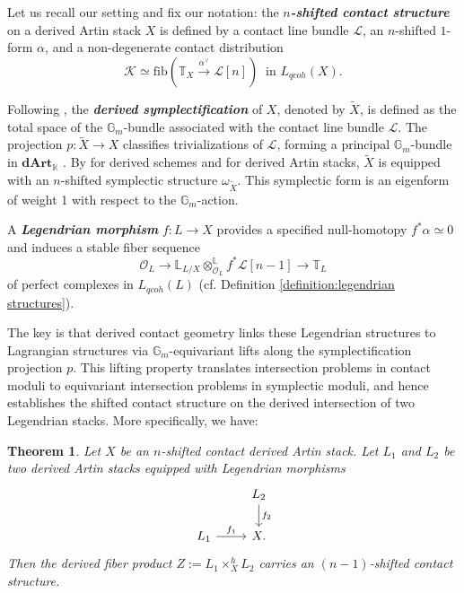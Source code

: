\documentclass[reqno]{amsart}
\newtheorem{theorem}{Theorem}[section]
\theoremstyle{definition}
\theoremstyle{remark}
\newcommand{\LL}{\mathbb{L}}
\newcommand{\TT}{\mathbb{T}}
\newcommand{\Gm}{\mathbb{G}_m}
\newcommand{\cO}{\mathcal{O}}
\newcommand{\cL}{\mathcal{L}}
\newcommand{\cK}{\mathcal{K}}
\newcommand{\K}{\mathbb{K}}
\newcommand{\dArt}{\mathbf{dArt}}
\newcommand{\bfem}[1]{\textbf{\textit{#1}}}
\begin{document}
{Let us recall our setting and fix our notation: the \bfem{${n}$-shifted contact structure} on a
derived Artin stack $X$ is defined by a contact line bundle $\cL$, an
$n$-shifted $1$-form $\alpha$, and a non-degenerate contact
distribution \[\cK \simeq \mathrm{fib}(\TT_X \xrightarrow{\alpha^\vee}
\cL[n]) \ \text{ in } L_{qcoh}(X).\]

Following \cite[Definition 4.3 and Proposition 4.4]{Berktav1}, the \bfem{derived symplectification} of $X$, denoted by $\widetilde{X}$, is defined as the total space of the $\Gm$-bundle associated with the contact line bundle $\cL$. 
The projection $p \colon \widetilde{X} \to X$ classifies trivializations of $\cL$, forming a principal $\Gm$-bundle in $\dArt_\K$ \cite[Section 1.3.5]{HAG-II}. 
By \cite[Theorem 4.7]{Berktav1} for derived schemes and \cite[Theorem 3.9]{Berktav2} for derived Artin stacks, $\widetilde{X}$ is equipped with an $n$-shifted symplectic structure $\omega_{\widetilde{X}}$. 
This symplectic form is an eigenform of weight 1 with respect to the $\Gm$-action.

A \bfem{Legendrian morphism} $f \colon L \to X$ provides a specified
null-homotopy $f^*\alpha \simeq 0$ and induces a stable fiber sequence
\begin{equation*}
  \cO_L \to \LL_{L/X} \otimes^{\mathbb{L}}_{\cO_L} f^*\cL[n-1] \to \TT_L
\end{equation*}
of perfect complexes in $L_{qcoh}(L)$ (cf. Definition \ref{definition:legendrian structures}).

The key is that derived contact geometry links these
Legendrian structures to Lagrangian structures via $\Gm$-equivariant
lifts along the symplectification projection $p$.
This lifting property translates intersection problems in contact
moduli to equivariant intersection problems in symplectic moduli, and hence establishes the shifted contact structure on the derived
intersection of two Legendrian stacks. More specifically, we have: 

\begin{theorem}  \label{thm:Leg intersection}
  Let $X$ be an $n$-shifted contact derived Artin stack. Let $L_1$ and
  $L_2$ be two derived Artin stacks equipped with Legendrian morphisms
  \[\begin{tikzcd}
                    & L_2 \arrow[d, "f_2"] \\
L_1 \arrow[r, "f_1"] & X.                   
\end{tikzcd}\]
  Then the derived
  fiber product $Z := L_1 \times_X^h L_2$ carries an $(n-1)$-shifted
  contact structure.
\end{theorem}
\vspace{0.1in}

}
\end{document}
